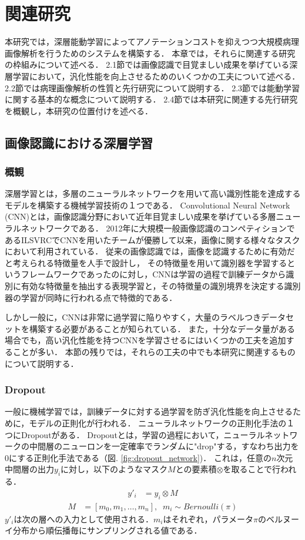 \chapter{関連研究}
本研究では，深層能動学習によってアノテーションコストを抑えつつ大規模病理画像解析を行うためのシステムを構築する．
本章では，それらに関連する研究の枠組みについて述べる．
2.1節では画像認識で目覚ましい成果を挙げている深層学習において，汎化性能を向上させるためのいくつかの工夫について述べる．
2.2節では病理画像解析の性質と先行研究について説明する．
2.3節では能動学習に関する基本的な概念について説明する．
2.4節では本研究に関連する先行研究を概観し，本研究の位置付けを述べる．

\section{画像認識における深層学習}
\subsection{概観}
深層学習とは，多層のニューラルネットワークを用いて高い識別性能を達成するモデルを構築する機械学習技術の１つである．
Convolutional Neural Network (CNN)とは，画像認識分野において近年目覚ましい成果を挙げている多層ニューラルネットワークである．
2012年に大規模一般画像認識のコンペティションであるILSVRC\cite{ILSVRC15}でCNNを用いたチームが優勝して以来，画像に関する様々なタスクにおいて利用されている．
従来の画像認識では，画像を認識するために有効だと考えられる特徴量を人手で設計し，
その特徴量を用いて識別器を学習するというフレームワークであったのに対し，CNNは学習の過程で訓練データから識別に有効な特徴量を抽出する表現学習と，その特徴量の識別境界を決定する識別器の学習が同時に行われる点で特徴的である．

しかし一般に，CNNは非常に過学習に陥りやすく，大量のラベルつきデータセットを構築する必要があることが知られている．
また，十分なデータ量がある場合でも，高い汎化性能を持つCNNを学習させるにはいくつかの工夫を追加することが多い．
本節の残りでは，それらの工夫の中でも本研究に関連するものについて説明する．

\subsection{\textbf{Dropout}}
一般に機械学習では，訓練データに対する過学習を防ぎ汎化性能を向上させるために，モデルの正則化が行われる．
ニューラルネットワークの正則化手法の１つにDropout\cite{hinton2012improving, srivastava2014dropout}がある．
Dropoutとは，学習の過程において，ニューラルネットワークの中間層のニューロンを一定確率でランダムに"drop"する，すなわち出力を0にする正則化手法である（図. \ref{fig:dropout_network})．
これは，任意の$n$次元中間層の出力$y_i$に対し，以下のようなマスク$M$との要素積$\otimes$を取ることで行われる．
\begin{eqnarray*}
    y'_i &= y_i \otimes M 
\end{eqnarray*}
\begin{eqnarray*}
    M &= [m_0, m_1, \dots, m_n],\;\; m_i \sim Bernoulli(\pi) 
\end{eqnarray*}
$y'_i$は次の層への入力として使用される．$m_i$はそれぞれ，パラメータ$\pi$のベルヌーイ分布から順伝播毎にサンプリングされる値である．

